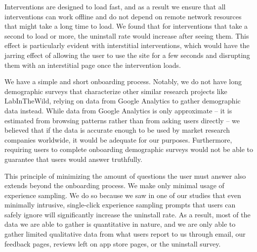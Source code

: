 Interventions are designed to load fast, and as a result we ensure that all interventions can work offline and do not depend on remote network resources that might take a long time to load. We found that for interventions that take a second to load or more, the uninstall rate would increase after seeing them. This effect is particularly evident with interstitial interventions, which would have the jarring effect of allowing the user to use the site for a few seconds and disrupting them with an interstitial page once the intervention loads.

We have a simple and short onboarding process. Notably, we do not have long demographic surveys that characterize other similar research projects like LabInTheWild, relying on data from Google Analytics to gather demographic data instead. While data from Google Analytics is only approximate -- it is estimated from browsing patterns rather than from asking users directly -- we believed that if the data is accurate enough to be used by market research companies worldwide, it would be adequate for our purposes. Furthermore, requiring users to complete onboarding demographic surveys would not be able to guarantee that users would answer truthfully.

This principle of minimizing the amount of questions the user must answer also extends beyond the onboarding process. We make only minimal usage of experience sampling. We do so because we saw in one of our studies that even minimally intrusive, single-click experience sampling prompts that users can safely ignore will significantly increase the uninstall rate. As a result, most of the data we are able to gather is quantitative in nature, and we are only able to gather limited qualitative data from what users report to us through email, our feedback pages, reviews left on app store pages, or the uninstall survey.






